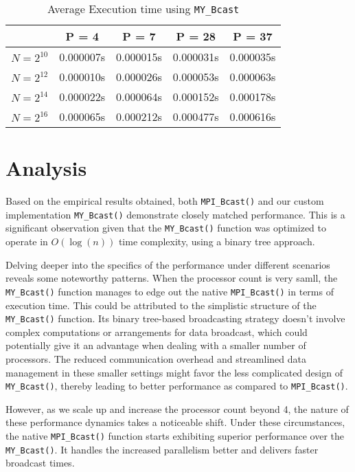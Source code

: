 \documentclass[12pt,a4paper]{article}
\begin{document}
\begin{table}[!htb]
   \centering    
   \begin{tabular}{|c|c|c|c|c|}    
   \hline    
   & P = 4 & P = 7 & P = 28 & P = 37 \\   
   \hline    
   $N = 2^{10}$ & 0.000007s & 0.000015s & 0.000031s & 0.000035s \\   
   \hline    
   $N = 2^{12}$ & 0.000010s & 0.000026s & 0.000053s & 0.000063s \\   
   \hline    
   $N = 2^{14}$ & 0.000022s & 0.000064s & 0.000152s & 0.000178s \\   
   \hline    
   $N = 2^{16}$ & 0.000065s & 0.000212s & 0.000477s & 0.000616s \\   
   \hline    
   \end{tabular}    
   \caption{Average Execution time using \texttt{MY\_Bcast}}    
   \label{tab:my_bcast}
\end{table}



\section{Analysis}

Based on the empirical results obtained,
 both \texttt{MPI\_Bcast()} and our custom implementation
 \texttt{MY\_Bcast()} demonstrate closely matched performance. 
This is a significant observation given that the \texttt{MY\_Bcast()} function 
 was optimized to operate in \(O(\log(n))\) time complexity, 
 using a binary tree approach.

Delving deeper into the specifics of the performance under different scenarios 
 reveals some noteworthy patterns.
When the processor count is very samll, the \texttt{MY\_Bcast()} function manages
 to edge out the native \texttt{MPI\_Bcast()} in terms of execution time. 
This could be attributed to the simplistic structure of the \texttt{MY\_Bcast()} function. 
Its binary tree-based broadcasting strategy doesn't involve complex computations 
 or arrangements for data broadcast, 
 which could potentially give it an advantage when dealing with a 
 smaller number of processors. 
The reduced communication overhead and streamlined data management in 
 these smaller settings might favor the less complicated design 
 of \texttt{MY\_Bcast()}, thereby leading to better performance 
 as compared to \texttt{MPI\_Bcast()}.

However, as we scale up and increase the processor count beyond 4, 
 the nature of these performance dynamics takes a noticeable shift. 
Under these circumstances, the native \texttt{MPI\_Bcast()} function starts 
 exhibiting superior performance over the \texttt{MY\_Bcast()}. 
It handles the increased parallelism better and delivers faster broadcast times. 
\end{document}
